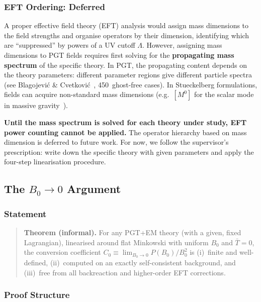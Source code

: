 \subsubsection{EFT Ordering: Deferred}
\label{sec:bv-eft-deferred}

A proper effective field theory (EFT) analysis would assign mass
dimensions to the field strengths and organise operators by their
dimension, identifying which are ``suppressed'' by powers of a UV cutoff
$\Lambda$.  However, assigning mass dimensions to PGT fields requires
first solving for the \textbf{propagating mass spectrum} of the specific
theory.  In PGT, the propagating content depends on the theory
parameters: different parameter regions give different particle spectra
(see Blagojevi\'{c} \& Cvetkovi\'{c}~\cite{blagojevic2018ghost},
450~ghost-free cases).  In Stueckelberg formulations, fields can acquire
non-standard mass dimensions (e.g.\ $[M^0]$ for the scalar mode in
massive gravity~\cite{aoki2020ghostfree}).

\textbf{Until the mass spectrum is solved for each theory under study,
EFT power counting cannot be applied.}  The operator hierarchy based on
mass dimension is deferred to future work.  For now, we follow the
supervisor's prescription: write down the specific theory with given
parameters and apply the four-step linearisation procedure.


\subsection{The $B_0 \to 0$ Argument}
\label{sec:bv-b0-argument}

\subsubsection{Statement}

\begin{quote}
\textbf{Theorem (informal).}\;
For any PGT+EM theory (with a given, fixed Lagrangian),
linearised around flat Minkowski with uniform $B_0$ and $\bar{T} = 0$,
the conversion coefficient
$C_0 \equiv \lim_{B_0 \to 0} P(B_0)/B_0^2$
is (i)~finite and well-defined, (ii)~computed on an exactly
self-consistent background, and (iii)~free from all backreaction
and higher-order EFT corrections.
\end{quote}

\subsubsection{Proof Structure}

